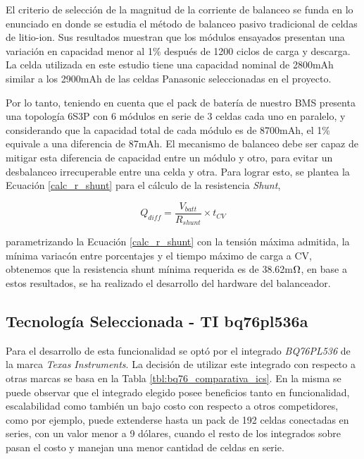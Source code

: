 \documentclass[10pt, a4paper]{report}
\begin{document}
El criterio de selección de la magnitud de la corriente de balanceo se
funda en lo enunciado en \cite{CAMPESTRINI2016142} donde se estudia el método de
balanceo pasivo tradicional de celdas de litio-ion. Sus resultados muestran que
los m\'odulos ensayados presentan una variaci\'on en capacidad menor al 1\% 
despu\'es de 1200 ciclos de carga y descarga. La celda utilizada en este estudio
tiene una capacidad nominal de 2800mAh similar a los 2900mAh de las celdas
Panasonic seleccionadas en el proyecto.

Por lo tanto, teniendo en cuenta que el pack de batería de nuestro
\acrshort{BMS} presenta una topología 6S3P con 6 módulos en serie de 3 celdas
cada uno en paralelo, y considerando que la capacidad total de cada m\'odulo es
de 8700mAh, el 1\% equivale a una diferencia de 87mAh. El mecanismo de
balanceo debe ser capaz de mitigar esta diferencia de capacidad entre un
m\'odulo y otro, para evitar un desbalanceo irrecuperable entre una celda y
otra. Para lograr esto, se plantea la Ecuaci\'on \ref{calc_r_shunt} para el
c\'alculo de la resistencia \emph{Shunt},

\begin{equation}
    Q_{diff} = \frac{V_{batt}}{R_{shunt}} \times t_{CV} \label{calc_r_shunt}
\end{equation}

parametrizando la Ecuaci\'on \ref{calc_r_shunt} con la tensi\'on m\'axima
admitida, la m\'inima variac\'on entre porcentajes y el tiempo m\'aximo de carga
a \acrshort{CV}, obtenemos que la resistencia shunt m\'inima requerida es de 
38.62m$\mathrm{\ohm}$, en base a estos resultados, se ha realizado el desarrollo
del hardware del balanceador.


\subsection{Tecnolog\'ia Seleccionada - TI bq76pl536a}
\label{seq:bq26_selection}

Para el desarrollo de esta funcionalidad se opt\'o por el integrado
\emph{BQ76PL536} de la marca \emph{Texas Instruments}. La decisi\'on de utilizar
este integrado con respecto a otras marcas se basa en la Tabla 
\ref{tbl:bq76_comparativa_ics}. En la misma se puede observar que el integrado
elegido posee beneficios tanto en funcionalidad, escalabilidad como tambi\'en un
bajo costo con respecto a otros competidores, como por ejemplo, puede extenderse
hasta un pack de 192 celdas conectadas en series, con un valor menor a 9
d\'olares, cuando el resto de los integrados sobre pasan el costo y manejan una
menor cantidad de celdas en serie.
\end{document}
